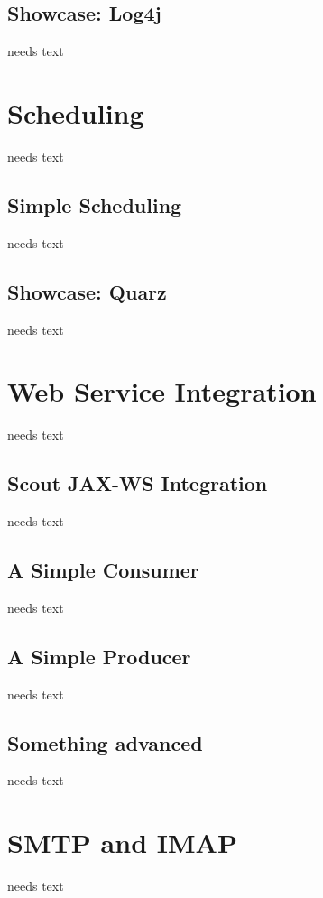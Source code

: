\documentclass[a4paper,10pt,twoside]{book}
\begin{document}
\subsection{Showcase: Log4j}
needs text
    
\section{Scheduling}
needs text

\subsection{Simple Scheduling}
needs text

\subsection{Showcase: Quarz}
needs text
    

\section{Web Service Integration}
needs text

\subsection{Scout JAX-WS Integration}
needs text

\subsection{A Simple Consumer}
needs text

\subsection{A Simple Producer}
needs text

\subsection{Something advanced}
needs text

\section{SMTP and IMAP}
needs text
\end{document}
